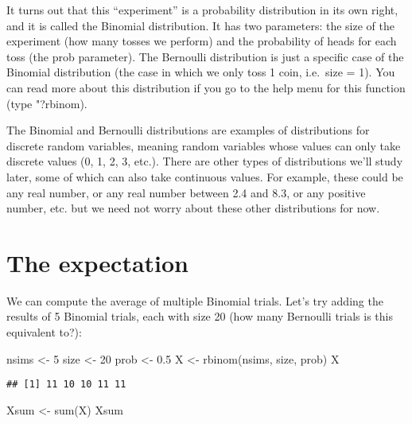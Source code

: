\documentclass[
]{book}
\newenvironment{Shaded}{\begin{snugshade}}{\end{snugshade}}
\newcommand{\DecValTok}[1]{\textcolor[rgb]{0.00,0.00,0.81}{#1}}
\newcommand{\FloatTok}[1]{\textcolor[rgb]{0.00,0.00,0.81}{#1}}
\newcommand{\FunctionTok}[1]{\textcolor[rgb]{0.00,0.00,0.00}{#1}}
\newcommand{\NormalTok}[1]{#1}
\newcommand{\OtherTok}[1]{\textcolor[rgb]{0.56,0.35,0.01}{#1}}
\begin{document}
It turns out that this ``experiment'' is a probability distribution in its own right, and it is called the Binomial distribution. It has two parameters: the size of the experiment (how many tosses we perform) and the probability of heads for each toss (the prob parameter). The Bernoulli distribution is just a specific case of the Binomial distribution (the case in which we only toss 1 coin, i.e.~size = 1). You can read more about this distribution if you go to the help menu for this function (type "?rbinom).

The Binomial and Bernoulli distributions are examples of distributions for discrete random variables, meaning random variables whose values can only take discrete values (0, 1, 2, 3, etc.). There are other types of distributions we'll study later, some of which can also take continuous values. For example, these could be any real number, or any real number between 2.4 and 8.3, or any positive number, etc. but we need not worry about these other distributions for now.

\hypertarget{the-expectation}{%
\section{The expectation}\label{the-expectation}}

We can compute the average of multiple Binomial trials. Let's try adding the results of 5 Binomial trials, each with size 20 (how many Bernoulli trials is this equivalent to?):

\begin{Shaded}
\begin{Highlighting}[]
\NormalTok{nsims }\OtherTok{\textless{}{-}} \DecValTok{5}
\NormalTok{size }\OtherTok{\textless{}{-}} \DecValTok{20}
\NormalTok{prob }\OtherTok{\textless{}{-}} \FloatTok{0.5}
\NormalTok{X }\OtherTok{\textless{}{-}} \FunctionTok{rbinom}\NormalTok{(nsims, size, prob)}
\NormalTok{X}
\end{Highlighting}
\end{Shaded}

\begin{verbatim}
## [1] 11 10 10 11 11
\end{verbatim}

\begin{Shaded}
\begin{Highlighting}[]
\NormalTok{Xsum }\OtherTok{\textless{}{-}} \FunctionTok{sum}\NormalTok{(X)}
\NormalTok{Xsum}
\end{Highlighting}
\end{Shaded}
\end{document}
